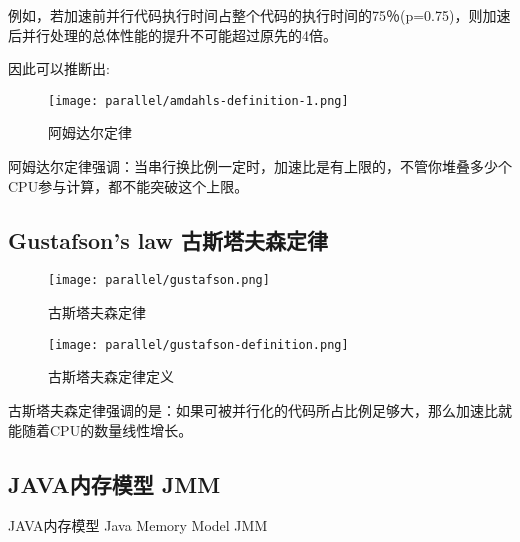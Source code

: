 例如，若加速前并行代码执行时间占整个代码的执行时间的75％(p=0.75)，则加速后并行处理的总体性能的提升不可能超过原先的4倍。

因此可以推断出:

 \begin{figure}[H]
    \centering
    \texttt{[image: parallel/amdahls-definition-1.png]}
    \caption{阿姆达尔定律}
\end{figure}

阿姆达尔定律强调：当串行换比例一定时，加速比是有上限的，不管你堆叠多少个CPU参与计算，都不能突破这个上限。


\subsection{Gustafson's law 古斯塔夫森定律}


 \begin{figure}[H]
    \centering
    \texttt{[image: parallel/gustafson.png]}
    \caption{古斯塔夫森定律}
\end{figure}

 \begin{figure}[H]
    \centering
    \texttt{[image: parallel/gustafson-definition.png]}
    \caption{古斯塔夫森定律定义}
\end{figure}

古斯塔夫森定律强调的是：如果可被并行化的代码所占比例足够大，那么加速比就能随着CPU的数量线性增长。



\subsection{JAVA内存模型 JMM}

JAVA内存模型 Java Memory Model JMM













